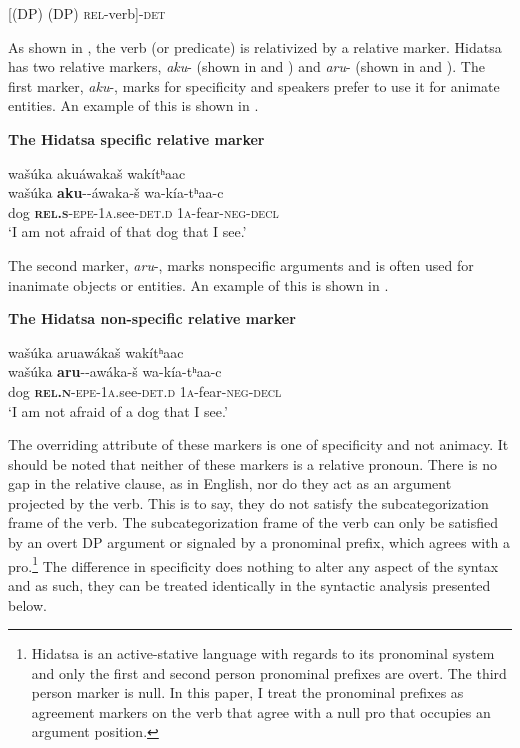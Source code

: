 \documentclass[output=paper]{LSP/langsci}
\begin{document}
[(DP) (DP) \textsc{rel}-verb]-\textsc{det}
\z

As shown in , the verb (or predicate) is relativized by a relative marker. Hidatsa has two relative markers, \textit{aku}- (shown in  and ) and \textit{aru}- (shown in  and ). The first marker, \textit{aku}-, marks for specificity and speakers prefer to use it for animate entities. An example of this is shown in .

\ea \textbf{The Hidatsa specific relative marker} \label{boyle7}

\glll wa\v{s}\'uka aku\'awaka\v{s} wak\'itʰaac\\
wa\v{s}\'uka \textbf{aku}--\'awaka-\v{s}  wa-k\'ia-tʰaa-c\\
dog \textbf{\textsc{rel.s}}-\textsc{epe}-\textsc{1a}.see-\textsc{det.d} \textsc{1a}-fear-\textsc{neg-decl}\\
\trans `I am not afraid of that dog that I see.' 
\z

The second marker, \textit{aru}-, marks nonspecific arguments and is often used for inanimate objects or entities. An example of this is shown in .

\ea \textbf{The Hidatsa non-specific relative marker} \label{boyle8}

\glll wa\v{s}\'uka aruaw\'aka\v{s} wak\'itʰaac\\
wa\v{s}\'uka \textbf{aru}--aw\'aka-\v{s}  wa-k\'ia-tʰaa-c\\
dog \textbf{\textsc{rel.n}}-\textsc{epe}-\textsc{1a}.see-\textsc{det.d} \textsc{1a}-fear-\textsc{neg-decl}\\
\trans `I am not afraid of a dog that I see.' 
\z

The overriding attribute of these markers is one of specificity and not animacy. It should be noted that neither of these markers is a relative pronoun. There is no gap in the relative clause, as in English, nor do they act as an argument projected by the verb. This is to say, they do not satisfy the subcategorization frame of the verb.  The subcategorization frame of the verb can only be satisfied by an overt DP argument or signaled by a pronominal prefix, which agrees with a pro.\footnote{Hidatsa is an active-stative language with regards to its pronominal system and only the first and second person pronominal prefixes are overt. The third person marker is null. In this paper, I treat the pronominal prefixes as agreement markers on the verb that agree with a null pro that occupies an argument position.} The difference in specificity does nothing to alter any aspect of the syntax and as such, they can be treated identically in the syntactic analysis presented below.
\end{document}
